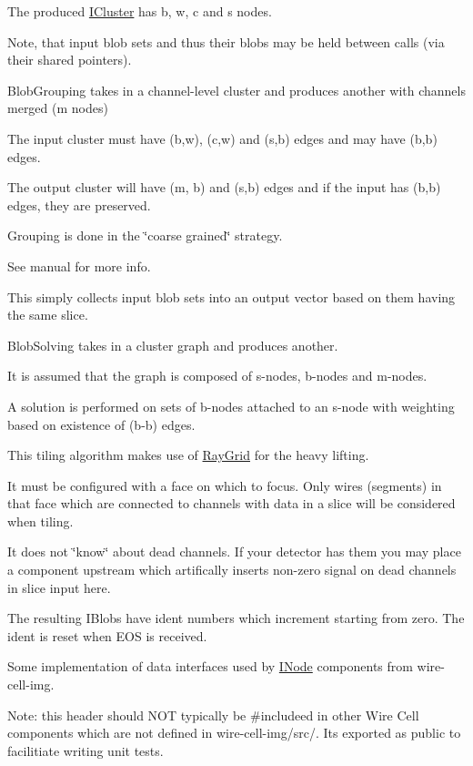 The produced \hyperlink{class_wire_cell_1_1_i_cluster}{I\+Cluster} has b, w, c and s nodes.

Note, that input blob sets and thus their blobs may be held between calls (via their shared pointers).

Blob\+Grouping takes in a channel-\/level cluster and produces another with channels merged (\textquotesingle{}m\textquotesingle{} nodes)

The input cluster must have (b,w), (c,w) and (s,b) edges and may have (b,b) edges.

The output cluster will have (m, b) and (s,b) edges and if the input has (b,b) edges, they are preserved.

Grouping is done in the \char`\"{}coarse grained\char`\"{} strategy.

See manual for more info.

This simply collects input blob sets into an output vector based on them having the same slice.

Blob\+Solving takes in a cluster graph and produces another.

It is assumed that the graph is composed of s-\/nodes, b-\/nodes and m-\/nodes.

A solution is performed on sets of b-\/nodes attached to an s-\/node with weighting based on existence of (b-\/b) edges.

This tiling algorithm makes use of \hyperlink{namespace_wire_cell_1_1_ray_grid}{Ray\+Grid} for the heavy lifting.

It must be configured with a face on which to focus. Only wires (segments) in that face which are connected to channels with data in a slice will be considered when tiling.

It does not \char`\"{}know\char`\"{} about dead channels. If your detector has them you may place a component upstream which artifically inserts non-\/zero signal on dead channels in slice input here.

The resulting I\+Blobs have ident numbers which increment starting from zero. The ident is reset when E\+OS is received.

Some implementation of data interfaces used by \hyperlink{class_wire_cell_1_1_i_node}{I\+Node} components from wire-\/cell-\/img.

Note\+: this header should N\+OT typically be \#include\textquotesingle{}ed in other Wire Cell components which are not defined in wire-\/cell-\/img/src/. It\textquotesingle{}s exported as public to facilitiate writing unit tests.

